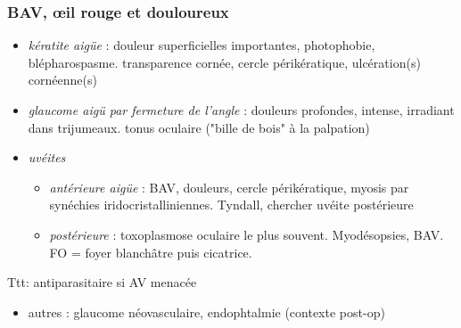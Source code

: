 \documentclass[11pt]{article}
\def\ttt{\hspace*{1cm}Ttt: }
\begin{document}
\subsubsection{BAV, \oe{}il rouge et douloureux}
\label{sec:org56fb1c1}
\begin{itemize}
\item \emph{kératite aigüe} : douleur superficielles importantes, photophobie,
blépharospasme. \dec transparence cornée, cercle périkératique, ulcération(s)
cornéenne(s)
\item \emph{glaucome aigü par fermeture de l'angle} : douleurs profondes, intense,
irradiant dans trijumeaux. \inc\inc tonus oculaire ("bille de bois" à la
palpation)
\item \emph{uvéites}
\begin{itemize}
\item \emph{antérieure aigüe} : BAV, douleurs, cercle périkératique, myosis par synéchies
iridocristalliniennes. Tyndall, chercher uvéite postérieure
\item \emph{postérieure} : toxoplasmose oculaire le plus souvent. Myodésopsies, BAV. FO =
foyer blanchâtre puis cicatrice. \\
\end{itemize}
\end{itemize}
\ttt antiparasitaire si AV menacée
\begin{itemize}
\item autres  : glaucome néovasculaire, endophtalmie (contexte post-op)
\end{itemize}
\end{document}
